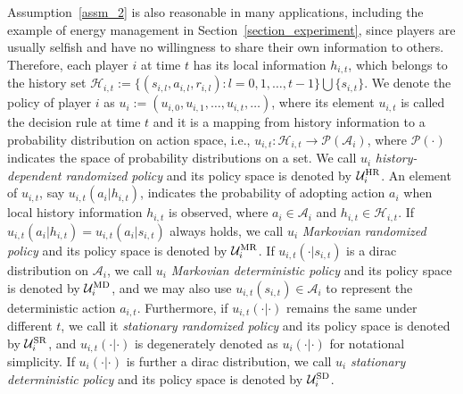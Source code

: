 \documentclass[12pt]{article}
\begin{document}
Assumption~\ref{assm_2} is also reasonable in many applications,
including the example of energy management in
Section~\ref{section_experiment}, since players are usually selfish
and have no willingness to share their own information to others.
Therefore, each player $i$ at time $t$ has its local information
$h_{i,t}$, which belongs to the history set $\mathcal H_{i,t} :=
\{(s_{i,l}, a_{i,l}, r_{i,l}) : l=0,1,\dots,t-1 \} \bigcup
\{s_{i,t}\}$. We denote the policy of player $i$ as $u_i :=
(u_{i,0}, u_{i,1}, \dots, u_{i,t},\dots)$, where its element
$u_{i,t}$ is called the decision rule at time $t$ and it is a
mapping from history information to a probability distribution on
action space, i.e., $u_{i,t} : \mathcal H_{i,t} \rightarrow \mathcal
P(\mathcal A_i)$, where $\mathcal P(\cdot)$ indicates the space of
probability distributions on a set. We call $u_i$
\emph{history-dependent randomized policy} and its policy space is
denoted by $\mathcal U^{\rm{HR}}_i$. An element of $u_{i,t}$, say
$u_{i,t}(a_i|h_{i,t})$, indicates the probability of adopting action
$a_i$ when local history information $h_{i,t}$ is observed, where
$a_i \in \mathcal A_i$ and $h_{i,t} \in \mathcal H_{i,t}$. If
$u_{i,t}(a_i|h_{i,t}) = u_{i,t}(a_i|s_{i,t})$ always holds, we call
$u_i$ \emph{Markovian randomized policy} and its policy space is
denoted by $\mathcal U^{\rm{MR}}_i$. If $u_{i,t}(\cdot|s_{i,t})$ is
a dirac distribution on $\mathcal A_i$, we call $u_i$
\emph{Markovian deterministic policy} and its policy space is
denoted by $\mathcal U^{\rm{MD}}_i$, and we may also use
$u_{i,t}(s_{i,t}) \in \mathcal A_i$ to represent the deterministic
action $a_{i,t}$. Furthermore, if $u_{i,t}(\cdot|\cdot)$ remains the
same under different $t$, we call it \emph{stationary randomized
policy} and its policy space is denoted by $\mathcal U^{\rm{SR}}_i$,
and $u_{i,t}(\cdot|\cdot)$ is degenerately denoted as
$u_{i}(\cdot|\cdot)$ for notational simplicity. If
$u_{i}(\cdot|\cdot)$ is further a dirac distribution, we call $u_i$
\emph{stationary deterministic policy} and its policy space is
denoted by $\mathcal U^{\rm{SD}}_i$.
\end{document}
